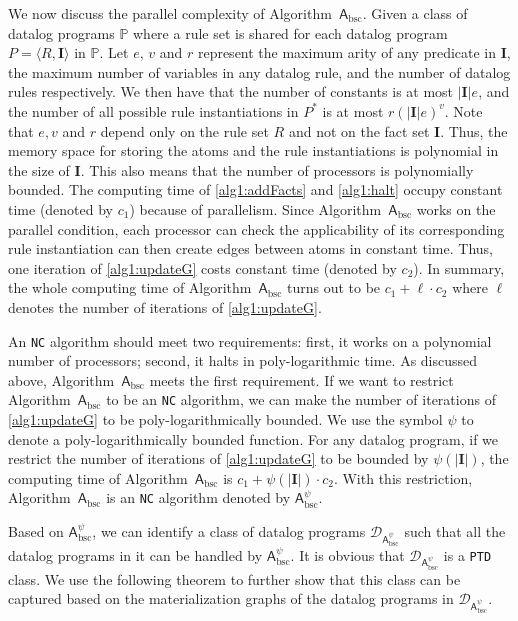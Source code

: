 We now discuss the parallel complexity of Algorithm~$\mathsf{A}_{\text{bsc}}$.
Given a class of datalog programs $\mathbb{P}$ where
a rule set is shared for each datalog program $P=\langle R, \textbf{I}\rangle$ in $\mathbb{P}$.
Let $e$, $v$ and $r$ represent the maximum arity of any predicate in $\textbf{I}$, the maximum number of variables
in any datalog rule, and the number of datalog rules respectively.
We then have that the number of
constants is at most $|\textbf{I}|e$, and the number of all possible rule instantiations in $P^*$
is at most $r(|\textbf{I}|e)^v$.
Note that $e, v$ and $r$ depend only on the rule set $R$ and not on the fact set $\textbf{I}$.
Thus, the memory space for storing the atoms and the rule instantiations is polynomial in the size of $\textbf{I}$.
This also means that the number of processors is polynomially bounded.
The computing time of \ref{alg1:addFacts} and \ref{alg1:halt} occupy constant time (denoted by $c_1$) because of parallelism.
Since Algorithm~$\mathsf{A}_{\text{bsc}}$ works on the parallel condition,
each processor can check the applicability of its corresponding
rule instantiation can then create edges between atoms in constant time. Thus,
one iteration of \ref{alg1:updateG} costs constant time (denoted by $c_2$). In summary,
the whole computing time of Algorithm~$\mathsf{A}_{\text{bsc}}$ turns out to be $c_1+\ell\cdot c_2$
where $\ell$ denotes the number of iterations of \ref{alg1:updateG}.

An \texttt{NC} algorithm should meet two requirements: first,
it works on a polynomial number of processors; second, it halts in poly-logarithmic time.
As discussed above, Algorithm~$\mathsf{A}_{\text{bsc}}$ meets the first requirement.
If we want to restrict Algorithm~$\mathsf{A}_{\text{bsc}}$ to be an \texttt{NC} algorithm,
we can make the number of iterations of \ref{alg1:updateG} to be poly-logarithmically bounded.
We use the symbol $\psi$ to denote a poly-logarithmically bounded function.
For any datalog program, if we restrict the number of iterations of
\ref{alg1:updateG} to be bounded by $\psi(|\textbf{I}|)$,
the computing time of Algorithm~$\mathsf{A}_{\text{bsc}}$
is $c_1+\psi(|\textbf{I}|)\cdot c_2$. With this restriction, Algorithm~$\mathsf{A}_{\text{bsc}}$ is an \texttt{NC} algorithm denoted by
$\mathsf{A}_{\text{bsc}}^{\psi}$.

Based on $\mathsf{A}_{\text{bsc}}^{\psi}$, we can identify a class of datalog programs
$\mathcal{D}_{\mathsf{A}_{\text{bsc}}^{\psi}}$ such that all the datalog programs in it can be handled
by $\mathsf{A}_{\text{bsc}}^{\psi}$.
It is obvious that $\mathcal{D}_{\mathsf{A}_{\text{bsc}}^{\psi}}$ is a \texttt{PTD} class.
We use the following theorem to further show that this class can be captured based on
the materialization graphs of the datalog programs in $\mathcal{D}_{\mathsf{A}_{\text{bsc}}^{\psi}}$.

